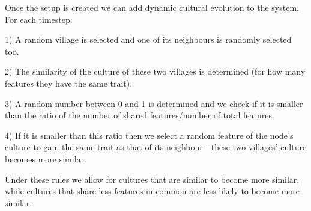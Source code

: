     Once the setup is created we can add dynamic cultural evolution to the system. For each timestep:
    
    1) A random village is selected and one of its neighbours is randomly selected too.
    
    2) The similarity of the culture of these two villages is determined (for how many features they have the same trait).
    
    3) A random number between 0 and 1 is determined and we check if it is smaller than the ratio of the number of shared features/number of total features.
    
    4) If it is smaller than this ratio then we select a random feature of the node's culture to gain the same trait as that of its neighbour - these two villages' culture becomes more similar.

    Under these rules we allow for cultures that are similar to become more similar, while cultures that share less features in common are less likely to become more similar.

